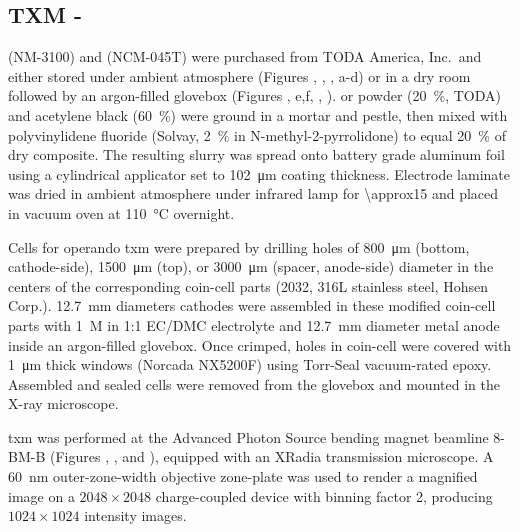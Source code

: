 \documentclass{WileyMSP-template}
\begin{document}
\subsection*{TXM - \nmc{}}

\nmc[333]{} (NM-3100) and \nmc[532]{} (NCM-045T) were purchased from
TODA America, Inc.\ and either stored under ambient atmosphere
(Figures , ,
, a-d) or
in a dry room followed by an argon-filled glovebox (Figures
, e,f,
,
). \nca{} or \nmc{} powder
(\SI{20}{\percent}, TODA) and acetylene black (\SI{60}{\percent}) were
ground in a mortar and pestle, then mixed with polyvinylidene fluoride
(Solvay, \SI{2}{\percent} in N-methyl-2-pyrrolidone) to equal
\SI{20}{\percent} of dry composite. The resulting slurry was spread
onto battery grade aluminum foil using a cylindrical applicator set to
\SI{102}{\micro\meter} coating thickness. Electrode laminate was dried
in ambient atmosphere under infrared lamp for \SI{\approx15}{\min} and
placed in vacuum oven at \SI{110}{\celsius} overnight.

Cells for operando \gls{txm} were prepared by drilling holes of
\SI{800}{\micro\meter} (bottom, cathode-side), \SI{1500}{\micro\meter}
(top), or \SI{3000}{\micro\meter} (spacer, anode-side) diameter in the
centers of the corresponding coin-cell parts (2032, 316L stainless
steel, Hohsen Corp.). \SI{12.7}{\milli\meter} diameters cathodes were
assembled in these modified coin-cell parts with \SI{1}{M} 
in 1:1 EC/DMC electrolyte and \SI{12.7}{\milli\meter} diameter 
metal anode inside an argon-filled glovebox. Once crimped, holes in
coin-cell were covered with \SI{1}{\micro\meter} thick 
windows (Norcada NX5200F) using Torr-Seal vacuum-rated
epoxy. Assembled and sealed cells were removed from the glovebox and
mounted in the X-ray microscope.

\gls{txm} was performed at the Advanced Photon Source bending magnet
beamline 8-BM-B (Figures ,
, and ),
equipped with an XRadia transmission microscope. A \SI{60}{nm}
outer-zone-width objective zone-plate was used to render a magnified
image on a $2048 \times 2048$ charge-coupled device with binning
factor 2, producing $1024 \times 1024$ intensity images.
\end{document}
